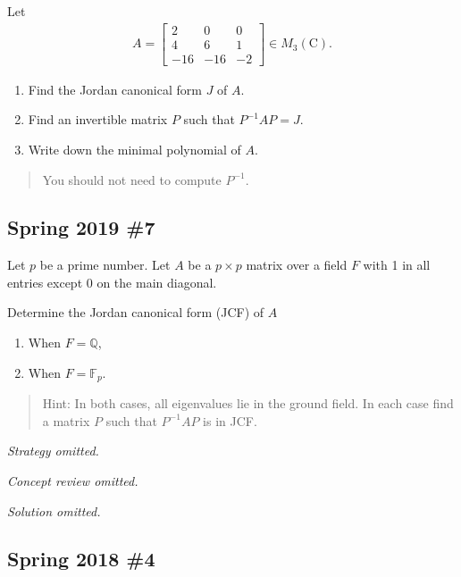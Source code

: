 Let
\begin{align*}
A=\left[\begin{array}{ccc}
2 & 0 & 0 \\
4 & 6 & 1 \\
-16 & -16 & -2
\end{array}\right] \in M_{3}(\mathrm{C})
.\end{align*}

\begin{enumerate}
\def\labelenumi{\alph{enumi}.}
\item
  Find the Jordan canonical form \(J\) of \(A\).
\item
  Find an invertible matrix \(P\) such that \(P^{-1}A P = J\).
\item
  Write down the minimal polynomial of \(A\).
\end{enumerate}

\begin{quote}
You should not need to compute \(P^{-1}\).
\end{quote}

\hypertarget{spring-2019-7}{%
\subsection{Spring 2019 \#7}\label{spring-2019-7}}

Let \(p\) be a prime number. Let \(A\) be a \(p \times p\) matrix over a
field \(F\) with 1 in all entries except 0 on the main diagonal.

Determine the Jordan canonical form (JCF) of \(A\)

\begin{enumerate}
\def\labelenumi{\alph{enumi}.}
\item
  When \(F = {\mathbb{Q}}\),
\item
  When \(F = {\mathbb{F}}_p\).
\end{enumerate}

\begin{quote}
Hint: In both cases, all eigenvalues lie in the ground field. In each
case find a matrix \(P\) such that \(P^{-1}AP\) is in JCF.
\end{quote}

\emph{Strategy omitted.}

\emph{Concept review omitted.}

\emph{Solution omitted.}

\hypertarget{spring-2018-4}{%
\subsection{Spring 2018 \#4}\label{spring-2018-4}}

